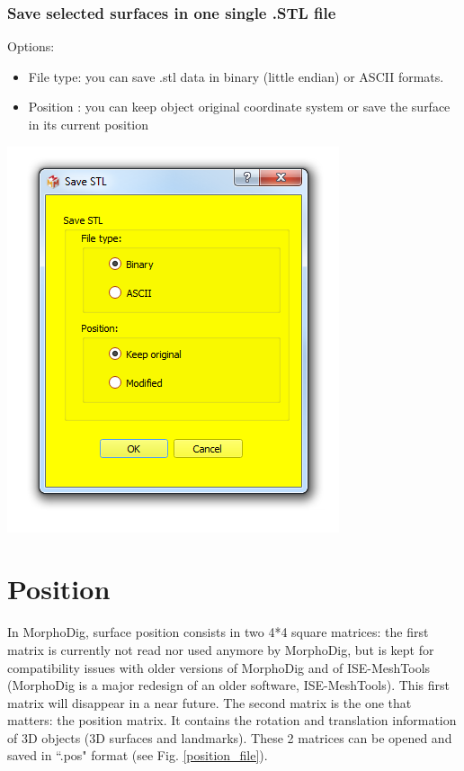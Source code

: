 \subsubsection{Save selected surfaces in one single .STL file}

\begin{minipage}{0.5\textwidth}
Options:
\begin{itemize}
\item File type: you can save .stl data in binary (little endian) or
ASCII formats.

\item Position : you can keep object original coordinate system or save the surface in its current position
\end{itemize}

\end{minipage}    
\begin{minipage}{0.5\textwidth}\centering
  \includegraphics[scale=0.5]{images/07/surface/save_stl.png}
 \end{minipage} 




\section{Position}
In MorphoDig, surface position consists in two
4*4 square matrices: the first matrix is currently not read nor used anymore by MorphoDig, but is kept for compatibility issues with older versions of MorphoDig and of ISE-MeshTools (MorphoDig is a major redesign of an older software, ISE-MeshTools). This first matrix will disappear in a near future.  The second matrix is the one that matters: the position matrix. It contains the rotation and translation information of 3D objects (3D surfaces and landmarks). These 2 matrices can be opened and saved in ``.pos" format (see Fig. \ref{position_file}).


